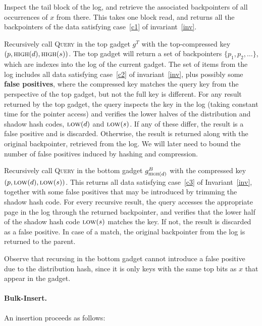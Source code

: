 \documentclass[letterpaper,11pt]{article}
\newenvironment{itemize*}{\vspace{-1ex}\begin{itemize}\setlength{\itemsep}{-0.5ex}\setlength{\parsep}{0pt}}{\end{itemize}}
\newcommand{\proc}[1]{\textnormal{\scshape#1}}
\newcommand{\MSB}{\proc{high}}
\newcommand{\LSB}{\proc{low}}
\begin{document}
\begin{itemize*}
\item Inspect the tail block of the log, and retrieve the associated
  backpointers of all occurrences of $x$ from there. This takes one
  block read, and returns all the backpointers of the data satisfying
  case~\ref{c1} of invariant~\ref{inv}.

\item Recursively call \proc{Query} in the top gadget $g^T$ with the
  top-compressed key $(p,\MSB(d),\MSB(s))$. The top gadget will return a
  set of backpointers $\{p_1, p_2, \ldots\}$, which are indexes into
  the log of the current gadget. The set of items from the log
  includes all data satisfying case~\ref{c2} of invariant~\ref{inv},
  plus possibly some {\bf false positives}, where the compressed key
  matches the query key from the perspective of the top gadget, but
  not the full key is different. For any result returned by the top
  gadget, the query inspects the key in the log (taking constant time
  for the pointer access) and verifies the lower halves of the
  distribution and shadow hash codes, $\LSB(d)$ and $\LSB(s)$. If any of
  these differ, the result is a false positive and is
  discarded. Otherwise, the result is returned along with the original
  backpointer, retrieved from the log. We will later need to bound the
  number of false positives induced by hashing and compression.

\item Recursively call \proc{Query} in the bottom gadget
  $g^B_{\MSB(d)}$ with the compressed key $(p,\LSB(d),\LSB(s))$. This
  returns all data satisfying case~\ref{c3} of Invariant~\ref{inv},
  together with some false positives that may be introduced by
  trimming the shadow hash code. For every recursive result, the query
  accesses the appropriate page in the log through the returned
  backpointer, and verifies that the lower half of the shadow hash
  code $\LSB(s)$ matches the key. If not, the result is discarded as a
  false positive. In case of a match, the original backpointer from
  the log is returned to the parent.
\end{itemize*}

Observe that recursing in the bottom gadget cannot introduce a false
positive due to the distribution hash, since it is only keys with the
same top bits as $x$ that appear in the gadget.




\paragraph{Bulk-Insert.}
An insertion proceeds as follows:
\end{document}
